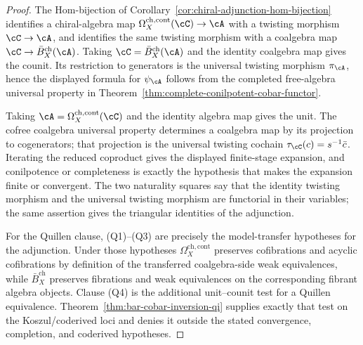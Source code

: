 \begin{proof}
The Hom-bijection of
Corollary~\ref{cor:chiral-adjunction-hom-bijection} identifies a
chiral-algebra map
$\Omega_X^{\mathrm{ch,cont}}(\cC)\to\cA$ with a twisting morphism
$\cC\to\cA$, and identifies the same twisting morphism with a
coalgebra map $\cC\to\bar B_X^{\mathrm{ch}}(\cA)$. Taking
$\cC=\bar B_X^{\mathrm{ch}}(\cA)$ and the identity coalgebra map gives
the counit. Its restriction to generators is the universal twisting
morphism $\pi_\cA$, hence the displayed formula for $\psi_\cA$ follows
from the completed free-algebra universal property in
Theorem~\ref{thm:complete-conilpotent-cobar-functor}.

Taking $\cA=\Omega_X^{\mathrm{ch,cont}}(\cC)$ and the identity
algebra map gives the unit. The cofree coalgebra universal property
determines a coalgebra map by its projection to cogenerators; that
projection is the universal twisting cochain
$\tau_\cC(c)=s^{-1}\bar c$. Iterating the reduced coproduct gives the
displayed finite-stage expansion, and conilpotence or completeness is
exactly the hypothesis that makes the expansion finite or convergent.
The two naturality squares say that the identity twisting morphism and
the universal twisting morphism are functorial in their variables; the
same assertion gives the triangular identities of the adjunction.

For the Quillen clause, \textup{(Q1)--(Q3)} are precisely the
model-transfer hypotheses for the adjunction. Under those hypotheses
$\Omega_X^{\mathrm{ch,cont}}$ preserves cofibrations and acyclic
cofibrations by definition of the transferred coalgebra-side weak
equivalences, while $\bar B_X^{\mathrm{ch}}$ preserves fibrations and
weak equivalences on the corresponding fibrant algebra objects. Clause
\textup{(Q4)} is the additional unit--counit test for a Quillen
equivalence. Theorem~\ref{thm:bar-cobar-inversion-qi} supplies exactly
that test on the Koszul/coderived loci and denies it outside the
stated convergence, completion, and coderived hypotheses.
\end{proof}

